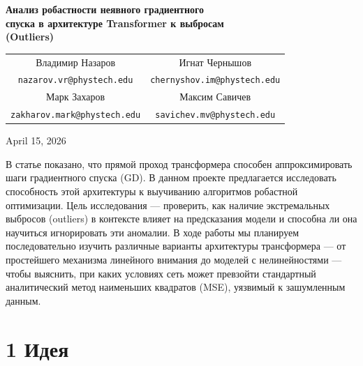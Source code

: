 \documentclass[12pt,a4paper]{article}
\begin{document}
	
	\begin{center}
		\LARGE \bfseries
		Анализ робастности неявного градиентного \\
		спуска в архитектуре Transformer к выбросам \\
		(Outliers)
	\end{center}
	
	\vspace{0.8cm}
	
	\begin{center}
		\begin{tabular}{cc}
			\large Владимир Назаров & \large Игнат Чернышов \\
			\texttt{nazarov.vr@phystech.edu} & \texttt{chernyshov.im@phystech.edu} \\
			\rule{0pt}{4ex} %
			\large Марк Захаров & \large Максим Савичев \\
			\texttt{zakharov.mark@phystech.edu} & \texttt{savichev.mv@phystech.edu}
		\end{tabular}
	\end{center}
	
	\vspace{0.8cm}
	
	\begin{center}
		\large April 15, 2026
	\end{center}
	
	\vspace{1cm}
	
	\noindent В статье \cite{vonOswald2023} показано, что прямой проход трансформера способен аппроксимировать шаги градиентного спуска (GD). В данном проекте предлагается исследовать способность этой архитектуры к выучиванию алгоритмов робастной оптимизации. Цель исследования --- проверить, как наличие экстремальных выбросов (outliers) в контексте влияет на предсказания модели и способна ли она научиться игнорировать эти аномалии. В ходе работы мы планируем последовательно изучить различные варианты архитектуры трансформера --- от простейшего механизма линейного внимания до моделей с нелинейностями --- чтобы выяснить, при каких условиях сеть может превзойти стандартный аналитический метод наименьших квадратов (MSE), уязвимый к зашумленным данным.
	
	\vspace{0.5cm}
	
	\section*{1 \quad Идея}
	
\end{document}
